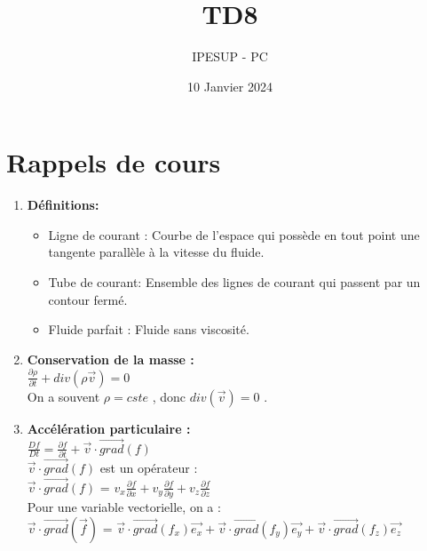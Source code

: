 \documentclass{article}
\title{TD8}
\author{IPESUP - PC }
\date{10 Janvier 2024}
\begin{document}
\maketitle



\section{Rappels de cours}
\begin{enumerate}

    \item \textbf{Définitions:}\\[0.1cm]
    \begin {itemize}
    \item Ligne de courant : Courbe de l'espace qui possède en tout point une tangente parallèle à la vitesse du fluide.\\
    \item Tube de courant: Ensemble des lignes de courant qui passent par un contour fermé.\\
    \item Fluide parfait : Fluide sans viscosité.\\
    \end{itemize}
    \item  \textbf{Conservation de la masse : }\\[0.2cm]
$     \frac{\partial \rho}{\partial t} + div(\rho \vec{v}) = 0$ \\

On a souvent $\rho = cste$ , donc $ div(\vec{v}) = 0 $ . \\[0.1cm]


\item \textbf{Accélération particulaire :}
 \\[0.1cm]

$\frac{Df}{Dt} = \frac{\partial f}{\partial t} + \vec{v} \cdot \vec{grad}(f)$\\

$\vec{v} \cdot \vec{grad}(f)$ est un opérateur : \\

$\vec{v} \cdot \vec{grad}(f)$ = $v_x \frac{\partial f}{\partial x} + v_y \frac{\partial f}{\partial y} + v_z \frac{\partial f}{\partial z}$\\

Pour une variable vectorielle, on a : \\[0.2cm]
$\vec{v} \cdot \vec{grad}(\vec{f})$ = $\vec{v} \cdot \vec{grad} (f_x) \vec{e_x} + \vec{v} \cdot \vec{grad} (f_y) \vec{e_y} + \vec{v} \cdot \vec{grad} (f_z) \vec{e_z} $\\


\end{enumerate}
\end{document}
